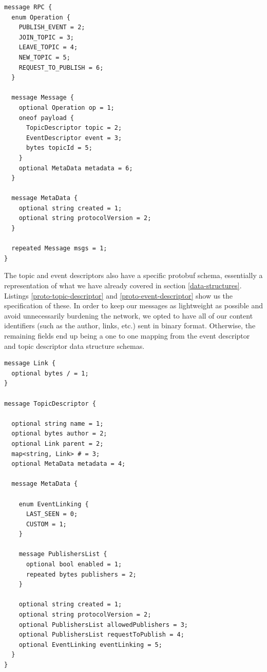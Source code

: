 \begin{lstlisting}[float, language=protobuf3,caption={Protobuf schema for our RPC messages},label={proto-rpc-message}]
message RPC {
  enum Operation {
    PUBLISH_EVENT = 2;
    JOIN_TOPIC = 3;
    LEAVE_TOPIC = 4;
    NEW_TOPIC = 5;
    REQUEST_TO_PUBLISH = 6;
  }

  message Message {
    optional Operation op = 1;
    oneof payload {
      TopicDescriptor topic = 2;
      EventDescriptor event = 3;
      bytes topicId = 5;
    }
    optional MetaData metadata = 6;
  }

  message MetaData {
    optional string created = 1;
    optional string protocolVersion = 2;
  }

  repeated Message msgs = 1;
}
\end{lstlisting}

The topic and event descriptors also have a specific protobuf schema,
essentially a representation of what we have already covered in section
\ref{data-structures}. Listings \ref{proto-topic-descriptor} and
\ref{proto-event-descriptor} show us the specification of these. In order to
keep our messages as lightweight as possible and avoid unnecessarily burdening
the network, we opted to have all of our content identifiers (such as the
author, links, etc.) sent in binary format. Otherwise, the remaining fields end
up being a one to one mapping from the event descriptor and topic descriptor
data structure schemas.

\begin{lstlisting}[float, language=protobuf3,caption={Protobuf schema of the topic descriptor},label={proto-topic-descriptor}]
message Link {
  optional bytes / = 1;
}

message TopicDescriptor {

  optional string name = 1;
  optional bytes author = 2;
  optional Link parent = 2;
  map<string, Link> # = 3;
  optional MetaData metadata = 4;

  message MetaData {

    enum EventLinking {
      LAST_SEEN = 0;
      CUSTOM = 1;
    }

    message PublishersList {
      optional bool enabled = 1;
      repeated bytes publishers = 2;
    }

    optional string created = 1;
    optional string protocolVersion = 2;
    optional PublishersList allowedPublishers = 3;
    optional PublishersList requestToPublish = 4;
    optional EventLinking eventLinking = 5;
  }
}
\end{lstlisting}

